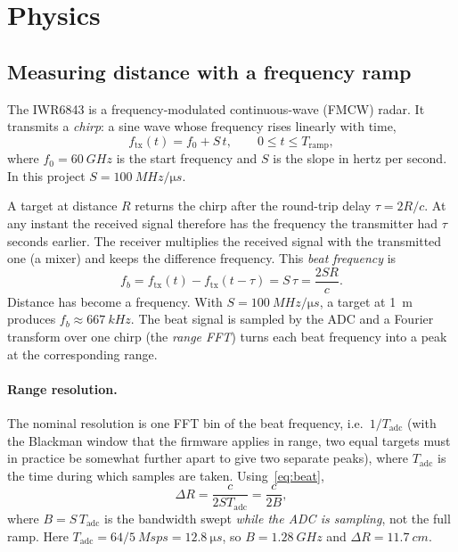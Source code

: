 \documentclass[11pt,a4paper]{article}
\begin{document}
\section{Physics}\label{sec:physics}

\subsection{Measuring distance with a frequency ramp}

The IWR6843 is a frequency-modulated continuous-wave (FMCW) radar. It transmits a \emph{chirp}: a sine wave whose frequency rises linearly with time,
\begin{equation}
f_{\mathrm{tx}}(t) = f_0 + S\,t, \qquad 0 \le t \le T_{\mathrm{ramp}},
\end{equation}
where $f_0 = \SI{60}{GHz}$ is the start frequency and $S$ is the slope in hertz per second. In this project $S = \SI{100}{MHz/\micro s}$.

A target at distance $R$ returns the chirp after the round-trip delay $\tau = 2R/c$. At any instant the received signal therefore has the frequency the transmitter had $\tau$ seconds earlier. The receiver multiplies the received signal with the transmitted one (a mixer) and keeps the difference frequency. This \emph{beat frequency} is
\begin{equation}
f_b = f_{\mathrm{tx}}(t) - f_{\mathrm{tx}}(t-\tau) = S\,\tau = \frac{2 S R}{c}.
\label{eq:beat}
\end{equation}
Distance has become a frequency. With $S = \SI{100}{MHz/\micro s}$, a target at \SI{1}{m} produces $f_b \approx \SI{667}{kHz}$. The beat signal is sampled by the ADC and a Fourier transform over one chirp (the \emph{range FFT}) turns each beat frequency into a peak at the corresponding range.

\paragraph{Range resolution.} The nominal resolution is one FFT bin of the beat frequency, i.e.\ $1/T_{\mathrm{adc}}$ (with the Blackman window that the firmware applies in range, two equal targets must in practice be somewhat further apart to give two separate peaks), where $T_{\mathrm{adc}}$ is the time during which samples are taken. Using~\eqref{eq:beat},
\begin{equation}
\Delta R = \frac{c}{2 S T_{\mathrm{adc}}} = \frac{c}{2B},
\end{equation}
where $B = S\,T_{\mathrm{adc}}$ is the bandwidth swept \emph{while the ADC is sampling}, not the full ramp. Here $T_{\mathrm{adc}} = 64 / \SI{5}{Msps} = \SI{12.8}{\micro s}$, so $B = \SI{1.28}{GHz}$ and $\Delta R = \SI{11.7}{cm}$.
\end{document}
